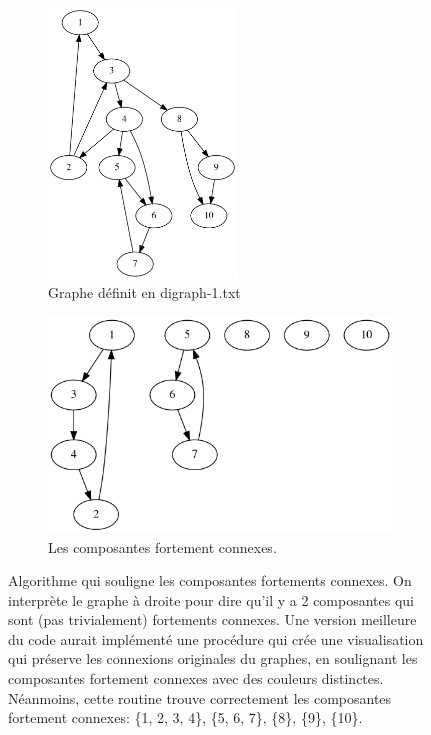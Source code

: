\documentclass[10pt]{article} %
\begin{document}
\begin{figure}[h!]
    \centering
    \begin{subfigure}{0.45\textwidth}
        \centering
        \includegraphics[width=5cm]{media/digraph.png}
        \caption{Graphe définit en digraph-1.txt}
    \end{subfigure}
    \hfill
    \begin{subfigure}{0.45\textwidth}
        \centering
        \includegraphics[width=\textwidth]{media/digraph_sg.png}
        \caption{Les composantes fortement connexes.}
    \end{subfigure}
    \caption{Algorithme qui souligne les composantes fortements connexes. On interprète le graphe à droite pour dire qu'il y a 2 composantes qui sont (pas trivialement) fortements connexes. Une version
    meilleure du code aurait implémenté une procédure qui crée une visualisation qui préserve les connexions originales du graphes, en soulignant les composantes fortement connexes avec des couleurs distinctes.
    Néanmoins, cette routine trouve correctement les composantes fortement connexes: \{1, 2, 3, 4\}, \{5, 6, 7\}, \{8\}, \{9\}, \{10\}.}
    \label{Fig:scc}

\end{figure}
\end{document}
